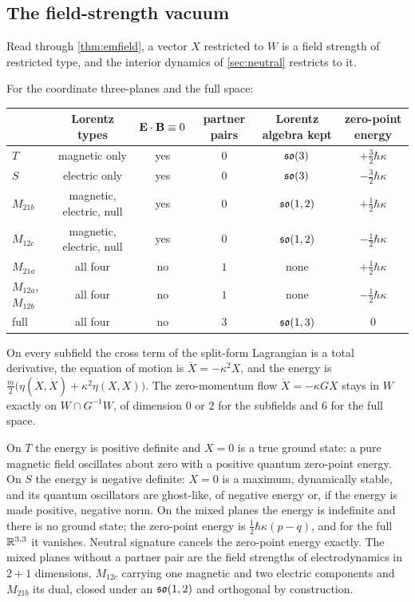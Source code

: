 \subsection{The field-strength vacuum}

Read through \cref{thm:emfield}, a vector $X$ restricted to $W$ is a field strength of restricted type, and the interior dynamics of
\cref{sec:neutral} restricts to it.

\begin{theorem}
\label{thm:subfs}
For the coordinate three-planes and the full space:
\begin{center}
\footnotesize\upshape
\setlength{\tabcolsep}{4pt}
\begin{tabular}{@{}lccccc@{}}
\toprule
 & Lorentz types & $\mathbf E\cdot\mathbf B\equiv0$ & partner pairs & Lorentz algebra kept & zero-point energy\\
\midrule
$T$ & magnetic only & yes & $0$ & $\mathfrak{so}(3)$ & $+\tfrac32\hbar\kappa$\\
$S$ & electric only & yes & $0$ & $\mathfrak{so}(3)$ & $-\tfrac32\hbar\kappa$\\
$M_{21b}$ & magnetic, electric, null & yes & $0$ & $\mathfrak{so}(1,2)$ & $+\tfrac12\hbar\kappa$\\
$M_{12c}$ & magnetic, electric, null & yes & $0$ & $\mathfrak{so}(1,2)$ & $-\tfrac12\hbar\kappa$\\
$M_{21a}$ & all four & no & $1$ & none & $+\tfrac12\hbar\kappa$\\
$M_{12a}$, $M_{12b}$ & all four & no & $1$ & none & $-\tfrac12\hbar\kappa$\\
full & all four & no & $3$ & $\mathfrak{so}(1,3)$ & $0$\\
\bottomrule
\end{tabular}
\end{center}
On every subfield the cross term of the split-form Lagrangian is a total derivative, the equation of motion is $\ddot X=-\kappa^2X$, and the
energy is $\tfrac m2\bigl(\eta(\dot X,\dot X)+\kappa^2\eta(X,X)\bigr)$. The zero-momentum flow $\dot X=-\kappa GX$ stays in $W$ exactly on
$W\cap G^{-1}W$, of dimension $0$ or $2$ for the subfields and $6$ for the full space.
\end{theorem}

On $T$ the energy is positive definite and $X=0$ is a true ground state: a pure magnetic field oscillates about zero with a positive quantum
zero-point energy. On $S$ the energy is negative definite: $X=0$ is a maximum, dynamically stable, and its quantum oscillators are ghost-like,
of negative energy or, if the energy is made positive, negative norm. On the mixed planes the energy is indefinite and there is no ground
state; the zero-point energy is $\tfrac12\hbar\kappa(p-q)$, and for the full $\mathbb{R}^{3,3}$ it vanishes. Neutral signature cancels the zero-point
energy exactly. The mixed planes without a partner pair are the field strengths of electrodynamics in $2{+}1$ dimensions, $M_{12c}$ carrying one
magnetic and two electric components and $M_{21b}$ its dual, closed under an $\mathfrak{so}(1,2)$ and orthogonal by construction.

